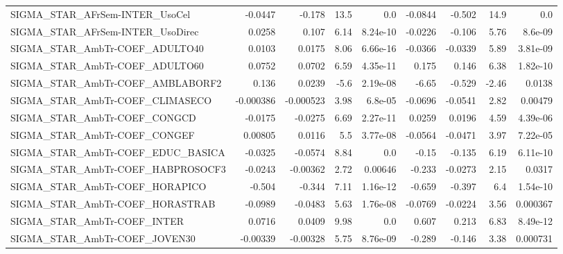 \begin{tabular}{lrrrrrrrr}
SIGMA\_STAR\_AFrSem-INTER\_UsoCel         &     -0.0447 &       -0.178 &    13.5 &      0.0 &    -0.0844 &      -0.502 &         14.9 &           0.0 \\
SIGMA\_STAR\_AFrSem-INTER\_UsoDirec       &      0.0258 &        0.107 &    6.14 & 8.24e-10 &    -0.0226 &      -0.106 &         5.76 &       8.6e-09 \\
SIGMA\_STAR\_AmbTr-COEF\_ADULTO40         &      0.0103 &       0.0175 &    8.06 & 6.66e-16 &    -0.0366 &     -0.0339 &         5.89 &      3.81e-09 \\
SIGMA\_STAR\_AmbTr-COEF\_ADULTO60         &      0.0752 &       0.0702 &    6.59 & 4.35e-11 &      0.175 &       0.146 &         6.38 &      1.82e-10 \\
SIGMA\_STAR\_AmbTr-COEF\_AMBLABORF2       &       0.136 &       0.0239 &    -5.6 & 2.19e-08 &      -6.65 &      -0.529 &        -2.46 &        0.0138 \\
SIGMA\_STAR\_AmbTr-COEF\_CLIMASECO        &   -0.000386 &    -0.000523 &    3.98 &  6.8e-05 &    -0.0696 &     -0.0541 &         2.82 &       0.00479 \\
SIGMA\_STAR\_AmbTr-COEF\_CONGCD           &     -0.0175 &      -0.0275 &    6.69 & 2.27e-11 &     0.0259 &      0.0196 &         4.59 &      4.39e-06 \\
SIGMA\_STAR\_AmbTr-COEF\_CONGEF           &     0.00805 &       0.0116 &     5.5 & 3.77e-08 &    -0.0564 &     -0.0471 &         3.97 &      7.22e-05 \\
SIGMA\_STAR\_AmbTr-COEF\_EDUC\_BASICA      &     -0.0325 &      -0.0574 &    8.84 &      0.0 &      -0.15 &      -0.135 &         6.19 &      6.11e-10 \\
SIGMA\_STAR\_AmbTr-COEF\_HABPROSOCF3      &     -0.0243 &     -0.00362 &    2.72 &  0.00646 &     -0.233 &     -0.0273 &         2.15 &        0.0317 \\
SIGMA\_STAR\_AmbTr-COEF\_HORAPICO         &      -0.504 &       -0.344 &    7.11 & 1.16e-12 &     -0.659 &      -0.397 &          6.4 &      1.54e-10 \\
SIGMA\_STAR\_AmbTr-COEF\_HORASTRAB        &     -0.0989 &      -0.0483 &    5.63 & 1.76e-08 &    -0.0769 &     -0.0224 &         3.56 &      0.000367 \\
SIGMA\_STAR\_AmbTr-COEF\_INTER            &      0.0716 &       0.0409 &    9.98 &      0.0 &      0.607 &       0.213 &         6.83 &      8.49e-12 \\
SIGMA\_STAR\_AmbTr-COEF\_JOVEN30          &    -0.00339 &     -0.00328 &    5.75 & 8.76e-09 &     -0.289 &      -0.146 &         3.38 &      0.000731 \\

\end{tabular}
